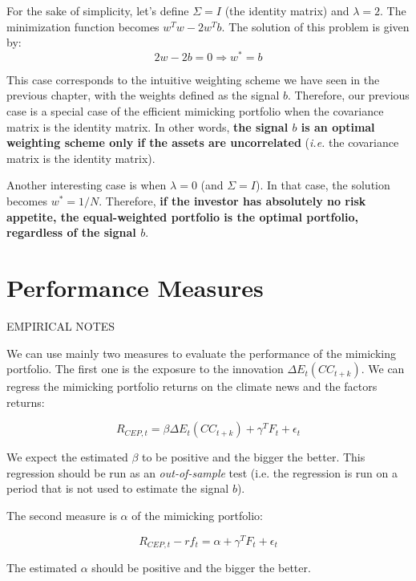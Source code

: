 For the sake of simplicity, let's define $\Sigma = I$ (the identity matrix)
and $\lambda = 2$.
The minimization function becomes $w^T w - 2 w^T b$. The solution of this problem is given by:
\begin{equation}
    2w - 2b = 0 \Rightarrow w^* = b
\end{equation}

This case corresponds to the intuitive weighting scheme 
we have seen in the previous chapter, with the weights defined 
as the signal $b$. Therefore, our previous case 
is a special case of the efficient mimicking portfolio 
when the covariance matrix is the identity matrix. 
In other words, \textbf{the signal $b$
is an optimal weighting scheme only if the assets are
uncorrelated} (\textit{i.e.} the covariance matrix is the identity matrix).

Another interesting case is when $\lambda = 0$ (and $\Sigma = I$).
In that case, the solution becomes $w^* = 1/N$. Therefore, \textbf{if 
the investor has absolutely no risk appetite, 
the equal-weighted portfolio is the optimal portfolio, 
regardless of the signal $b$}.





\section{Performance Measures}

EMPIRICAL NOTES

We can use mainly two measures to evaluate the performance of the mimicking portfolio. 
The first one is the exposure to the innovation $\Delta E_t(CC_{t+k})$.
We can regress the mimicking portfolio returns on the 
climate news and the factors returns:

\begin{equation}
    R_{CEP,t} = \beta \Delta E_t(CC_{t+k}) + \gamma^T F_t + \epsilon_t
\end{equation}

We expect the estimated $\beta$ to be positive and the bigger the better.
This regression should be run as an \textit{out-of-sample} test (i.e. the regression is run on a period that is not used to estimate the signal $b$).

The second measure is $\alpha$ of the mimicking portfolio:

\begin{equation}
    R_{CEP,t} - rf_t = \alpha + \gamma^T F_t + \epsilon_t
\end{equation}

The estimated $\alpha$ should be positive and the bigger the better.
